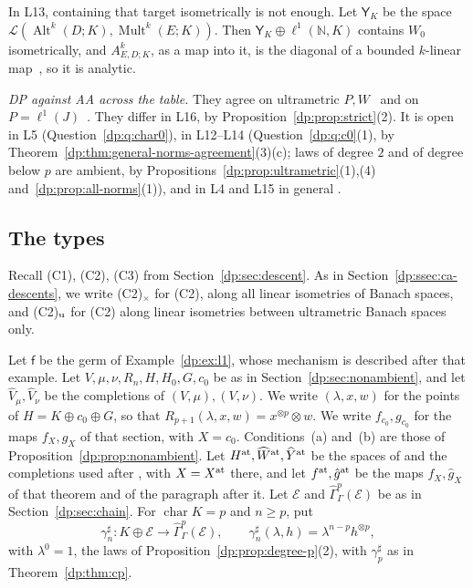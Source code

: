 \documentclass[11pt]{amsart}
\theoremstyle{definition}
\theoremstyle{remark}
\numberwithin{equation}{section}
\newcommand{\N}{\mathbb N}
\newcommand{\cL}{\mathcal L}
\newcommand{\Alt}{\operatorname{Alt}}
\newcommand{\Mult}{\operatorname{Mult}}
\theoremstyle{plain}
\theoremstyle{definition}
\theoremstyle{plain}
\newcommand{\hGamma}{\widehat\Gamma}
\begin{document}
In L13, containing that target isometrically is not enough. Let $\mathsf Y_K$ be the space $\cL(\Alt^k(D;K),\Mult^k(E;K))$. Then $\mathsf Y_K\oplus\ell^1(\N,K)$ contains $W_0$ isometrically, and $A^k_{E,D;K}$, as a map into it, is the diagonal of a bounded $k$\nobreakdash-linear map~\cite[Proposition~2.2]{I}, so it is analytic.

\emph{DP against AA across the table.} They agree on ultrametric $P,W$~\cite[Theorem~14.39(1)]{I} and on $P=\ell^1(J)$~\cite[Theorem~14.39(2)]{I}. They differ in L16, by Proposition~\ref{dp:prop:strict}(2). It is open in L5 (Question~\ref{dp:q:char0}), in L12--L14 (Question~\ref{dp:q:c0}(1), by Theorem~\ref{dp:thm:general-norms-agreement}(3)(c); laws of degree $2$ and of degree below $p$ are ambient, by Propositions~\ref{dp:prop:ultrametric}(1),(4) and~\ref{dp:prop:all-norms}(1)), and in L4 and L15 in general \cite[Question~14.42(4)]{I}.

\subsection{The types}\label{dp:ssec:types}

Recall (C1), (C2), (C3) from Section~\ref{dp:sec:descent}. As in Section~\ref{dp:ssec:ca-descents}, we write (C2)$_\times$ for (C2), along all linear isometries of Banach spaces, and (C2)$_{\rm u}$ for (C2) along linear isometries between ultrametric Banach spaces only.

Let $\mathsf f$ be the germ of Example~\ref{dp:ex:l1}, whose mechanism is described after that example. Let $V,\mu,\nu,R_n,H,H_0,G,c_0$ be as in Section~\ref{dp:sec:nonambient}, and let $\widehat V_\mu,\widehat V_\nu$ be the completions of $(V,\mu),(V,\nu)$. We write $(\lambda,x,w)$ for the points of $H=K\oplus c_0\oplus G$, so that $R_{p+1}(\lambda,x,w)=x^{\otimes p}\otimes w$. We write $f_{c_0},g_{c_0}$ for the maps $f_X,g_X$ of that section, with $X=c_0$. Conditions~(a) and~(b) are those of Proposition~\ref{dp:prop:nonambient}. Let $H^{\rm at},\widehat W^{\rm at},\widehat Y^{\rm at}$ be the spaces of \cite[Definition~14.16]{I} and the completions used after \cite[Theorem~14.17]{I}, with $X=X^{\rm at}$ there, and let $f^{\rm at},\hat g^{\rm at}$ be the maps $f_X,\hat g_X$ of that theorem and of the paragraph after it. Let $\mathcal E$ and $\hGamma^p_\Gamma(\mathcal E)$ be as in Section~\ref{dp:sec:chain}. For $\operatorname{char}K=p$ and $n\ge p$, put
\[
 \gamma^\sharp_n\colon K\oplus\mathcal E\to\hGamma^p_\Gamma(\mathcal E),\qquad\gamma^\sharp_n(\lambda,h)=\lambda^{n-p}h^{\otimes p},
\]
with $\lambda^0=1$, the laws of Proposition~\ref{dp:prop:degree-p}(2), with $\gamma^\sharp_p$ as in Theorem~\ref{dp:thm:cp}.
\end{document}
